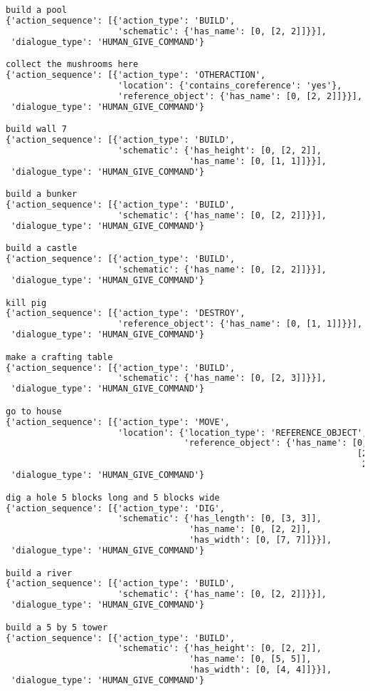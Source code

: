 \begin{lstlisting}[language=TeX]
build a pool
{'action_sequence': [{'action_type': 'BUILD',
                      'schematic': {'has_name': [0, [2, 2]]}}],
 'dialogue_type': 'HUMAN_GIVE_COMMAND'}

collect the mushrooms here
{'action_sequence': [{'action_type': 'OTHERACTION',
                      'location': {'contains_coreference': 'yes'},
                      'reference_object': {'has_name': [0, [2, 2]]}}],
 'dialogue_type': 'HUMAN_GIVE_COMMAND'}

build wall 7
{'action_sequence': [{'action_type': 'BUILD',
                      'schematic': {'has_height': [0, [2, 2]],
                                    'has_name': [0, [1, 1]]}}],
 'dialogue_type': 'HUMAN_GIVE_COMMAND'}

build a bunker
{'action_sequence': [{'action_type': 'BUILD',
                      'schematic': {'has_name': [0, [2, 2]]}}],
 'dialogue_type': 'HUMAN_GIVE_COMMAND'}

build a castle
{'action_sequence': [{'action_type': 'BUILD',
                      'schematic': {'has_name': [0, [2, 2]]}}],
 'dialogue_type': 'HUMAN_GIVE_COMMAND'}

kill pig
{'action_sequence': [{'action_type': 'DESTROY',
                      'reference_object': {'has_name': [0, [1, 1]]}}],
 'dialogue_type': 'HUMAN_GIVE_COMMAND'}

make a crafting table
{'action_sequence': [{'action_type': 'BUILD',
                      'schematic': {'has_name': [0, [2, 3]]}}],
 'dialogue_type': 'HUMAN_GIVE_COMMAND'}

go to house
{'action_sequence': [{'action_type': 'MOVE',
                      'location': {'location_type': 'REFERENCE_OBJECT',
                                   'reference_object': {'has_name': [0,
                                                                     [2,
                                                                      2]]}}}],
 'dialogue_type': 'HUMAN_GIVE_COMMAND'}

dig a hole 5 blocks long and 5 blocks wide
{'action_sequence': [{'action_type': 'DIG',
                      'schematic': {'has_length': [0, [3, 3]],
                                    'has_name': [0, [2, 2]],
                                    'has_width': [0, [7, 7]]}}],
 'dialogue_type': 'HUMAN_GIVE_COMMAND'}

build a river
{'action_sequence': [{'action_type': 'BUILD',
                      'schematic': {'has_name': [0, [2, 2]]}}],
 'dialogue_type': 'HUMAN_GIVE_COMMAND'}

build a 5 by 5 tower
{'action_sequence': [{'action_type': 'BUILD',
                      'schematic': {'has_height': [0, [2, 2]],
                                    'has_name': [0, [5, 5]],
                                    'has_width': [0, [4, 4]]}}],
 'dialogue_type': 'HUMAN_GIVE_COMMAND'}


\end{lstlisting}
